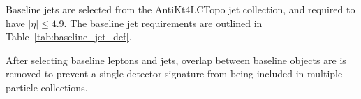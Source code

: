 \begin{table}[ht]
  \caption{Baseline muon requirements.}
  \label{tab:baseline_mu_def}
\end{table}

Baseline jets are selected from the AntiKt4LCTopo jet collection, and required
to have $|\eta| \leq 4.9$.
The baseline jet requirements are outlined in Table~\ref{tab:baseline_jet_def}.

\begin{table}[ht]
    \caption{Baseline jet requirements.}
    \label{tab:baseline_jet_def}
\end{table}

After selecting baseline leptons and jets, overlap between baseline objects are
is removed to prevent a single detector signature from being included in
multiple particle collections. 

